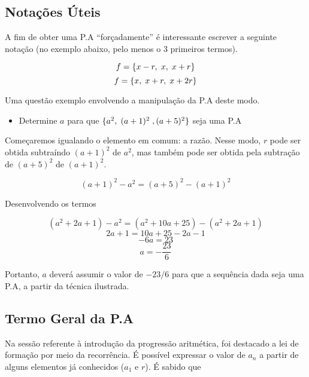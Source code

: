 \subsection{Notações Úteis}

A fim de obter uma P.A ``forçadamente'' é interessante escrever a seguinte notação (no exemplo abaixo, pelo menos o 3 primeiros termos).

\begin{tcolorbox}[colback=LightGreen]
\[f = \{x - r,\hspace{0.1cm} x,\hspace{0.1cm} x + r\}\]
\[f = \{x,\hspace{0.1cm} x + r,\hspace{0.1cm} x + 2r\}\]
\end{tcolorbox}

Uma questão exemplo envolvendo a manipulação da P.A deste modo.

\begin{tcolorbox}[colback=LightYellow]
\begin{itemize}
  \item Determine $a$ para que $\{a^{2},\hspace{0.1cm} (a + 1)^{2}\hspace{0.1cm}, (a + 5)^{2}\}$ seja uma P.A
\end{itemize}
\end{tcolorbox}

\begin{tcolorbox}[colback=LightYellow]
Começaremos igualando o elemento em comum: a razão. Nesse modo, $r$ pode ser obtida subtraíndo $(a + 1)^{2}$ de $a^{2}$, mas também pode ser obtida pela subtração de $(a + 5)^{2}$ de $(a + 1)^{2}$.

\[(a + 1)^{2} - a^{2} = (a + 5)^{2} - (a + 1)^{2}\]

Desenvolvendo os termos

\[(a^{2} + 2a + 1) - a^{2} = (a^{2} + 10a + 25) - (a^{2} + 2a + 1)\]
\[2a + 1 = 10a + 25 - 2a - 1\]
\[-6a = 23\]
\[a = -\frac{23}{6}\]

Portanto, $a$ deverá assumir o valor de $-23/6$ para que a sequência dada seja uma P.A, a partir da técnica ilustrada.
\end{tcolorbox}

\subsection{Termo Geral da P.A}

Na sessão referente à introdução da progressão aritmética, foi destacado a lei de formação por meio da recorrência. É possível expressar o valor de $a_{n}$ a partir de alguns elementos já conhecidos ($a_{1}$ e $r$). É sabido que

